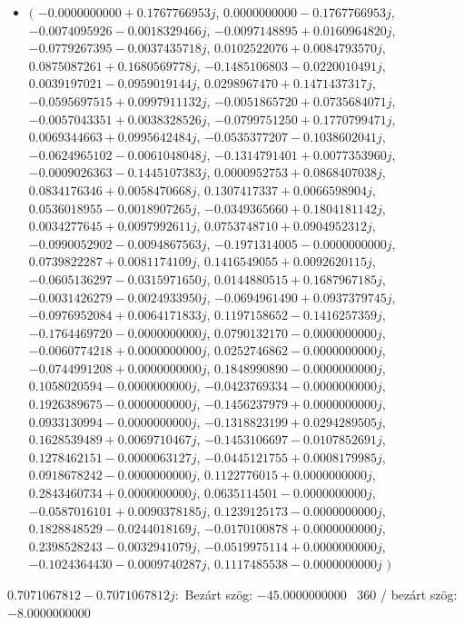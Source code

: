 \documentclass[14pt,a4paper]{article}
\begin{document}
\begin{itemize}
\item
$\big($
$-0.0000000000+0.1767766953j$, $0.0000000000-0.1767766953j$, $-0.0074095926-0.0018329466j$, $-0.0097148895+0.0160964820j$, $-0.0779267395-0.0037435718j$, $0.0102522076+0.0084793570j$, $0.0875087261+0.1680569778j$, $-0.1485106803-0.0220010491j$, $0.0039197021-0.0959019144j$, $0.0298967470+0.1471437317j$, $-0.0595697515+0.0997911132j$, $-0.0051865720+0.0735684071j$, $-0.0057043351+0.0038328526j$, $-0.0799751250+0.1770799471j$, $0.0069344663+0.0995642484j$, $-0.0535377207-0.1038602041j$, $-0.0624965102-0.0061048048j$, $-0.1314791401+0.0077353960j$, $-0.0009026363-0.1445107383j$, $0.0000952753+0.0868407038j$, $0.0834176346+0.0058470668j$, $0.1307417337+0.0066598904j$, $0.0536018955-0.0018907265j$, $-0.0349365660+0.1804181142j$, $0.0034277645+0.0097992611j$, $0.0753748710+0.0904952312j$, $-0.0990052902-0.0094867563j$, $-0.1971314005-0.0000000000j$, $0.0739822287+0.0081174109j$, $0.1416549055+0.0092620115j$, $-0.0605136297-0.0315971650j$, $0.0144880515+0.1687967185j$, $-0.0031426279-0.0024933950j$, $-0.0694961490+0.0937379745j$, $-0.0976952084+0.0064171833j$, $0.1197158652-0.1416257359j$, $-0.1764469720-0.0000000000j$, $0.0790132170-0.0000000000j$, $-0.0060774218+0.0000000000j$, $0.0252746862-0.0000000000j$, $-0.0744991208+0.0000000000j$, $0.1848990890-0.0000000000j$, $0.1058020594-0.0000000000j$, $-0.0423769334-0.0000000000j$, $0.1926389675-0.0000000000j$, $-0.1456237979+0.0000000000j$, $0.0933130994-0.0000000000j$, $-0.1318823199+0.0294289505j$, $0.1628539489+0.0069710467j$, $-0.1453106697-0.0107852691j$, $0.1278462151-0.0000063127j$, $-0.0445121755+0.0008179985j$, $0.0918678242-0.0000000000j$, $0.1122776015+0.0000000000j$, $0.2843460734+0.0000000000j$, $0.0635114501-0.0000000000j$, $-0.0587016101+0.0090378185j$, $0.1239125173-0.0000000000j$, $0.1828848529-0.0244018169j$, $-0.0170100878+0.0000000000j$, $0.2398528243-0.0032941079j$, $-0.0519975114+0.0000000000j$, $-0.1024364430-0.0009740287j$, $0.1117485538-0.0000000000j$
$\big)$
\end{itemize}
$0.7071067812-0.7071067812j$:\
Bezárt szög: $-45.0000000000$ \
360 / bezárt szög: $-8.0000000000$\
\end{document}

